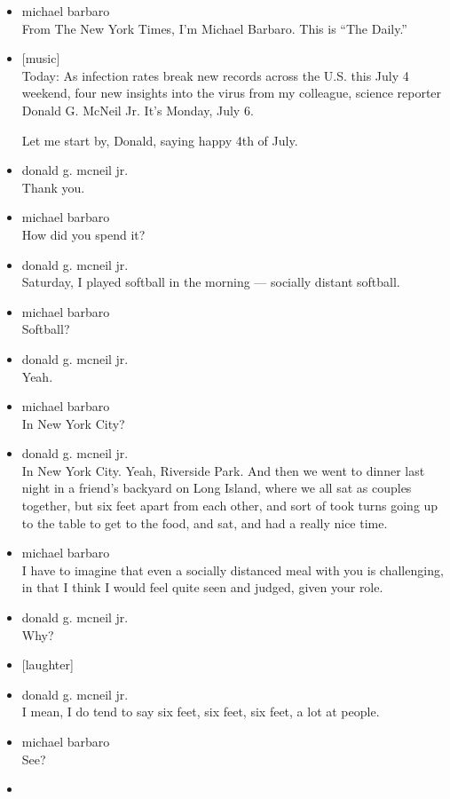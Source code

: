 \begin{itemize}
\item
  michael barbaro\\
  From The New York Times, I'm Michael Barbaro. This is ``The Daily.''
\item
  {[}music{]}\\
  Today: As infection rates break new records across the U.S. this July
  4 weekend, four new insights into the virus from my colleague, science
  reporter Donald G. McNeil Jr. It's Monday, July 6.

  Let me start by, Donald, saying happy 4th of July.
\item
  donald g. mcneil jr.\\
  Thank you.
\item
  michael barbaro\\
  How did you spend it?
\item
  donald g. mcneil jr.\\
  Saturday, I played softball in the morning --- socially distant
  softball.
\item
  michael barbaro\\
  Softball?
\item
  donald g. mcneil jr.\\
  Yeah.
\item
  michael barbaro\\
  In New York City?
\item
  donald g. mcneil jr.\\
  In New York City. Yeah, Riverside Park. And then we went to dinner
  last night in a friend's backyard on Long Island, where we all sat as
  couples together, but six feet apart from each other, and sort of took
  turns going up to the table to get to the food, and sat, and had a
  really nice time.
\item
  michael barbaro\\
  I have to imagine that even a socially distanced meal with you is
  challenging, in that I think I would feel quite seen and judged, given
  your role.
\item
  donald g. mcneil jr.\\
  Why?
\item
  {[}laughter{]}
\item
  donald g. mcneil jr.\\
  I mean, I do tend to say six feet, six feet, six feet, a lot at
  people.
\item
  michael barbaro\\
  See?
\item

\end{itemize}
